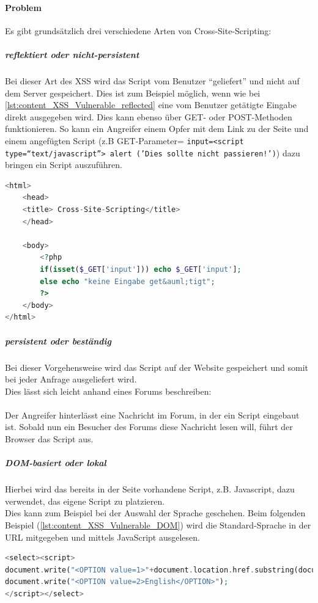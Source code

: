\paragraph{Problem}
Es gibt grundsätzlich drei verschiedene Arten von Cross-Site-Scripting:
\subparagraph{reflektiert oder nicht-persistent}
Bei dieser Art des XSS wird das Script vom Benutzer \enquote{geliefert} und nicht auf dem Server gespeichert. Dies ist zum Beispiel möglich, wenn wie bei \autoref{lst:content_XSS_Vulnerable_reflected} eine vom Benutzer getätigte Eingabe direkt ausgegeben wird. Dies kann ebenso über GET- oder POST-Methoden funktionieren. So kann ein Angreifer einem Opfer mit dem Link zu der Seite und einem angefügten Script (z.B GET-Parameter= \texttt{input=<script type=\enquote{text/javascript}> alert ('Dies sollte nicht passieren!')}) dazu bringen ein Script auszuführen.
\begin{lstlisting}[style=custom, language=PHP, caption={ reflektiertes Cross-Site-Scripting Anfällig},label={lst:content_XSS_Vulnerable_reflected}]
<html>
	<head>
	<title> Cross-Site-Scripting</title>
	</head>

	<body>
		<?php
		if(isset($_GET['input'])) echo $_GET['input'];
		else echo "keine Eingabe get&auml;tigt";			
		?>
	</body>
</html>
\end{lstlisting}
\subparagraph{persistent oder beständig}
Bei dieser Vorgehensweise wird das Script auf der Website gespeichert und somit bei jeder Anfrage ausgeliefert wird. \\ Dies lässt sich leicht anhand eines Forums beschreiben:\\\\
Der Angreifer hinterlässt eine Nachricht im Forum, in der ein Script eingebaut ist. Sobald nun ein Besucher des Forums diese Nachricht lesen will, führt der Browser das Script aus.
\subparagraph{DOM-basiert oder lokal}
Hierbei wird das bereits in der Seite vorhandene Script, z.B. Javascript, dazu verwendet, das eigene Script zu platzieren.\\
Dies kann zum Beispiel bei der Auswahl der Sprache geschehen. Beim folgenden Beispiel (\autoref{lst:content_XSS_Vulnerable_DOM}) wird die Standard-Sprache in der URL mitgegeben und mittels JavaScript ausgelesen.
\begin{lstlisting}[style=custom, language=PHP, caption={DOM-Cross-Site-Scripting Anfällig},label={lst:content_XSS_Vulnerable_DOM}]
<select><script>
document.write("<OPTION value=1>"+document.location.href.substring(document.location.href.indexOf("default=")+8)+"</OPTION>");
document.write("<OPTION value=2>English</OPTION>");
</script></select>
\end{lstlisting}

